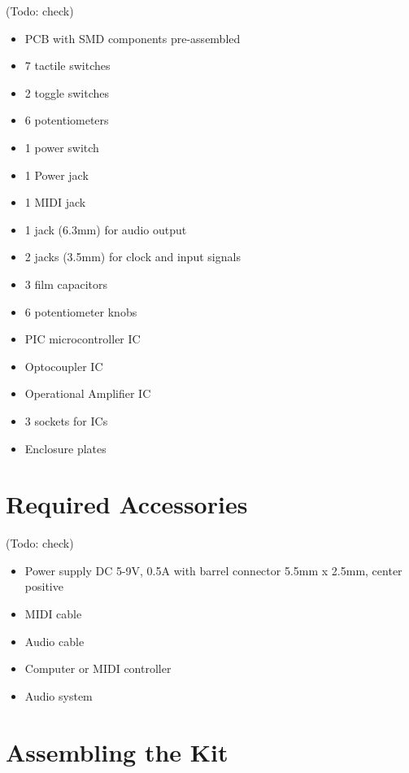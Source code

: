 \documentclass{scrartcl}
\begin{document}
 (Todo: check)

\begin{itemize}
    \item PCB with SMD components pre-assembled
    \item 7 tactile switches
    \item 2 toggle switches
    \item 6 potentiometers
    \item 1 power switch
    \item 1 Power jack
    \item 1 MIDI jack
    \item 1 jack (6.3mm) for audio output
    \item 2 jacks (3.5mm) for clock and input signals
    \item 3 film capacitors
    \item 6 potentiometer knobs
    \item PIC microcontroller IC
    \item Optocoupler IC
    \item Operational Amplifier IC
    \item 3 sockets for ICs
    \item Enclosure plates
\end{itemize}


\section{Required Accessories}

 (Todo: check)

\begin{itemize}
    \item Power supply DC 5-9V, 0.5A with barrel connector 5.5mm x 2.5mm, center positive
    \item MIDI cable
    \item Audio cable
    \item Computer or MIDI controller
    \item Audio system
\end{itemize}


\section{Assembling the Kit}
\end{document}
